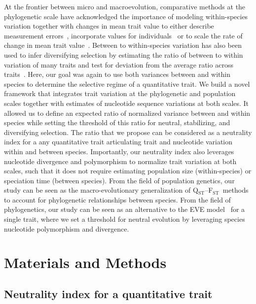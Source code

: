 \documentclass{article}
\newcommand{\Qst}{Q$_\text{ST}$}
\newcommand{\Fst}{F$_\text{ST}$}
\newcommand{\QstFst}{\Qst--\Fst}
\begin{document}
At the frontier between micro and macroevolution, comparative methods at the phylogenetic scale have acknowledged the importance of modeling within-species variation together with changes in mean trait value to either describe measurement errors~\parencite{lynch_methods_1991, hansen_interpreting_2012}, incorporate values for individuals~\parencite{felsenstein_comparative_2008} or to scale the rate of change in mean trait value~\parencite{kostikova_bridging_2016, gaboriau_multiplatform_2020, gaboriau_exploring_2023}.
Between to within-species variation has also been used to infer diversifying selection by estimating the ratio of between to within variation of many traits and test for deviation from the average ratio across traits~\parencite{rohlfs_modeling_2014, rohlfs_phylogenetic_2015}.
Here, our goal was again to use both variances between and within species to determine the selective regime of a quantitative trait.
We build a novel framework that integrates trait variation at the phylogenetic and population scales together with estimates of nucleotide sequence variations at both scales.
It allowed us to define an expected ratio of normalized variance between and within species while setting the threshold of this ratio for neutral, stabilizing, and diversifying selection.
The ratio that we propose can be considered as a neutrality index for a any quantitative trait articulating trait and nucleotide variation within and between species.
Importantly, our neutrality index also leverages nucleotide divergence and polymorphism to normalize trait variation at both scales, such that it does not require estimating population size (within-species) or speciation time (between species).
From the field of population genetics, our study can be seen as the macro-evolutionary generalization of \QstFst\ methods to account for phylogenetic relationships between species.
From the field of phylogenetics, our study can be seen as an alternative to the EVE model~\parencite{rohlfs_modeling_2014, rohlfs_phylogenetic_2015} for a single trait, where we set a threshold for neutral evolution by leveraging species nucleotide polymorphism and divergence.


\section*{Materials and Methods}\label{sec:materials-and-methods}
\subsection*{Neutrality index for a quantitative trait}\label{subsec:neutrality-index-for-a-quantitative-trait}
\end{document}
